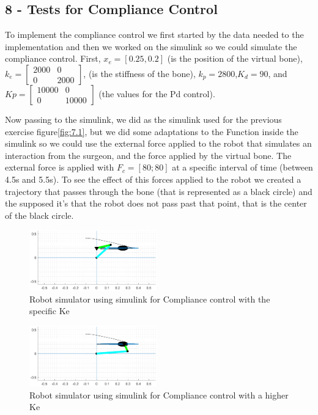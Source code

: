 \subsection{8 - Tests for Compliance Control}

To implement the compliance control we first started by the data needed to the implementation and then we worked on the simulink so we could simulate the compliance control. First, $x_e=[0.25,0.2]$ (is the position of the virtual bone), $k_e=\begin{bmatrix}
2000 & 0\\
0 & 2000
\end{bmatrix}$, (is the stiffness of the bone), $k_p=2800$,$K_d=90$, and $Kp=\begin{bmatrix}
10000 & 0\\
0 & 10000
\end{bmatrix}$ (the values for the Pd control).

Now passing to the simulink, we did as the simulink used for the previous exercise figure\eqref{fig:7.1}, but we did some adaptations to the Function inside the simulink so we could use the external force applied to the robot that simulates an interaction from the surgeon, and the force applied by the virtual bone. The external force is applied with $F_c=[80;80]$ at a specific interval of time (between 4.5s and 5.5s). To see the effect of this forces applied to the robot we created a trajectory that passes through the bone (that is represented as a black circle) and the supposed it's that the robot does not pass past that point, that is the center of the black circle.

\begin{figure}[H]
    \centering
    \includegraphics[width=0.49\textwidth]{imgs/8.1.eps}
    \caption{Robot simulator using simulink for Compliance control with the specific Ke}
    \label{fig:8.1}
\end{figure}

\begin{figure}[H]
    \centering
    \includegraphics[width=0.49\textwidth]{imgs/8.2.eps}
    \caption{Robot simulator using simulink for Compliance control with a higher Ke}
    \label{fig:8.2}
\end{figure}

